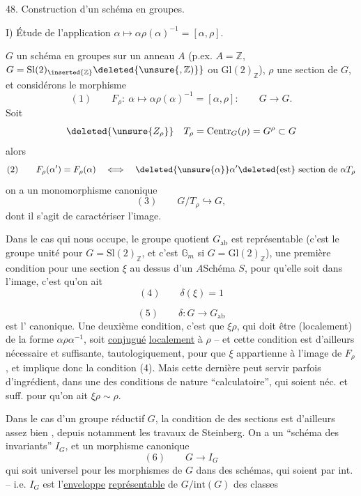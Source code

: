 
48. Construction d'un schéma en groupes.

I) Étude de l'application $\alpha\longmapsto
\alpha\rho(\alpha)^{-1}=[\alpha,\rho]$.

 $G$ un schéma en groupes sur un anneau
$A$ (p.ex. $A=\mathbb Z$, $G=\mathrm{Sl}(2)_{\inserted{\mathbb Z}}
\deleted{\unsure{,\mathbb Z)}}$ ou $\mathrm{Gl}(2)_{\mathbb Z}$),
$\rho$ une section de $G$, et considérons le morphisme
\[
(1)\qquad
F_\rho:\ \alpha\longmapsto\alpha\rho(\alpha)^{-1}
=[\alpha,\rho]:\qquad G\longrightarrow G.
\]
Soit
\[
\deleted{\unsure{Z_\rho}}\quad
T_\rho
=\mathrm{Centr}_G(\rho)=G^\rho\subset G
\]
alors
\[
(2)\qquad
F_\rho(\alpha')=F_\rho(\alpha)\quad\Longleftrightarrow\quad
\deleted{\unsure{\alpha}}\alpha'\deleted{\text{est}}
\text{ section de }\alpha T_\rho
\]
 on a un monomorphisme canonique
\[
(3)\qquad
G/T_\rho\hookrightarrow G,
\]
dont il s'agit de caractériser l'image.

Dans le cas qui nous occupe, le groupe quotient $G_{\mathrm{ab}}$
est représentable (c'est le groupe unité pour
$G=\mathrm{Sl}(2)_{\mathbb Z}$, et c'est $\mathbb G_m$ si
$G=\mathrm{Gl}(2)_{\mathbb Z}$),
 une première condition pour
une section $\xi$
au dessus d'un $A$Schéma $S$,  pour qu'elle
soit dans l'image, c'est qu'on ait
\[
(4)\qquad\delta(\xi)=1
\]

\[
(5)\qquad \delta:G\longrightarrow G_{\mathrm{ab}}
\]
est l' canonique. Une deuxième condition, c'est que $\xi\rho$, qui doit être (localement) de la forme $\alpha\rho\alpha^{-1}$, soit \uline{conjugué} \uline{localement} à $\rho$ -- et cette condition est d'ailleurs nécessaire et suffisante, tautologiquement, pour que $\xi$ appartienne à l'image de $F_\rho$, et implique donc la condition (4). Mais cette dernière peut servir parfois d'ingrédient,  dans une  des conditions de nature ``calculatoire'', qui soient néc. et suff. pour qu'on ait $\xi\rho\sim\rho$.

Dans le cas d'un groupe réductif $G$, la condition de   des sections est d'ailleurs assez bien , depuis notamment les travaux de Steinberg. On a un ``schéma des invariants'' $I_G$, et un morphisme canonique
\[
(6)\qquad G\longrightarrow I_G
\]
\unsure{(}qui soit universel  pour les morphismes de $G$ dans des schémas, qui soient  par  int. -- i.e. $I_G$ est l'\uline{enveloppe} \uline{représentable} de $G/\mathrm{int}(G)$  des classes

